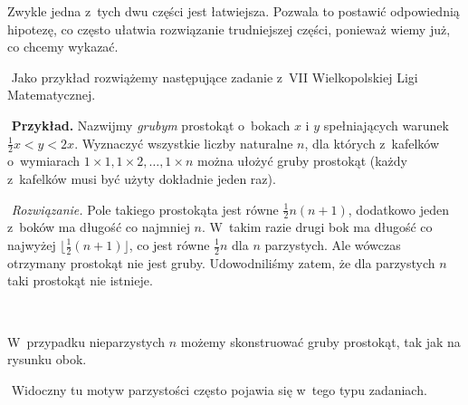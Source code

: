 Zwykle jedna z~tych dwu części jest łatwiejsza. Pozwala to postawić odpowiednią hipotezę, co często ułatwia rozwiązanie trudniejszej części, ponieważ wiemy już, co chcemy wykazać.\par
﻿
Jako przykład rozwiążemy następujące zadanie z~VII Wielkopolskiej Ligi Matematycznej.\par
﻿
\textbf{Przykład.} Nazwijmy \emph{grubym} prostokąt o~bokach $x$ i $y$ spełniających warunek $\frac12x < y<2x$. Wyznaczyć wszystkie liczby naturalne $n$, dla których z~kafelków o~wymiarach $1\times1, 1\times2, \ldots, 1\times n$ można ułożyć gruby prostokąt (każdy z~kafelków musi być użyty dokładnie jeden raz).\par
﻿
\emph{Rozwiązanie.} Pole takiego prostokąta jest równe $\frac12n(n+1)$, dodatkowo jeden z~boków ma długość co najmniej $n$. W~takim razie drugi bok ma długość co najwyżej $\lfloor\frac12(n+1)\rfloor$, co jest równe $\frac12n$ dla $n$ parzystych. Ale wówczas otrzymany prostokąt nie jest gruby. Udowodniliśmy zatem, że dla parzystych $n$ taki prostokąt nie istnieje. \par
﻿
\smallskip
\begin{minipage}{\textwidth}
\begin{minipage}{6cm}
W~przypadku nieparzystych $n$ możemy skonstruować gruby prostokąt, tak jak na rysunku obok.
\end{minipage}\hspace*{.5cm}
\end{minipage}\par\medskip
﻿
Widoczny tu motyw parzystości często pojawia się w~tego typu zadaniach.\par


